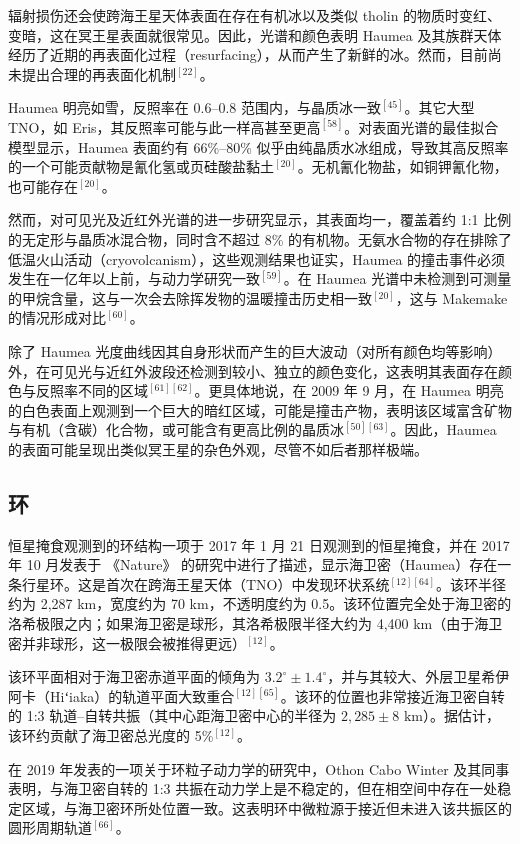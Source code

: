 辐射损伤还会使跨海王星天体表面在存在有机冰以及类似 tholin 的物质时变红、变暗，这在冥王星表面就很常见。因此，光谱和颜色表明 Haumea 及其族群天体经历了近期的再表面化过程（resurfacing），从而产生了新鲜的冰。然而，目前尚未提出合理的再表面化机制$^{[22]}$。

Haumea 明亮如雪，反照率在 0.6–0.8 范围内，与晶质冰一致$^{[45]}$。其它大型 TNO，如 Eris，其反照率可能与此一样高甚至更高$^{[58]}$。对表面光谱的最佳拟合模型显示，Haumea 表面约有 66\%–80\% 似乎由纯晶质水冰组成，导致其高反照率的一个可能贡献物是氰化氢或页硅酸盐黏土$^{[20]}$。无机氰化物盐，如铜钾氰化物，也可能存在$^{[20]}$。

然而，对可见光及近红外光谱的进一步研究显示，其表面均一，覆盖着约 1:1 比例的无定形与晶质冰混合物，同时含不超过 8\% 的有机物。无氨水合物的存在排除了低温火山活动（cryovolcanism），这些观测结果也证实，Haumea 的撞击事件必须发生在一亿年以上前，与动力学研究一致$^{[59]}$。在 Haumea 光谱中未检测到可测量的甲烷含量，这与一次会去除挥发物的温暖撞击历史相一致$^{[20]}$，这与 Makemake 的情况形成对比$^{[60]}$。

除了 Haumea 光度曲线因其自身形状而产生的巨大波动（对所有颜色均等影响）外，在可见光与近红外波段还检测到较小、独立的颜色变化，这表明其表面存在颜色与反照率不同的区域$^{[61][62]}$。更具体地说，在 2009 年 9 月，在 Haumea 明亮的白色表面上观测到一个巨大的暗红区域，可能是撞击产物，表明该区域富含矿物与有机（含碳）化合物，或可能含有更高比例的晶质冰$^{[50][63]}$。因此，Haumea 的表面可能呈现出类似冥王星的杂色外观，尽管不如后者那样极端。
\subsection{环}
恒星掩食观测到的环结构一项于 2017 年 1 月 21 日观测到的恒星掩食，并在 2017 年 10 月发表于 《Nature》 的研究中进行了描述，显示海卫密（Haumea）存在一条行星环。这是首次在跨海王星天体（TNO）中发现环状系统$^{[12][64]}$。该环半径约为 2,287 km，宽度约为 70 km，不透明度约为 0.5。该环位置完全处于海卫密的洛希极限之内；如果海卫密是球形，其洛希极限半径大约为 4,400 km（由于海卫密并非球形，这一极限会被推得更远）$^{[12]}$。

该环平面相对于海卫密赤道平面的倾角为 $3.2^\circ \pm 1.4^\circ$，并与其较大、外层卫星希伊阿卡（Hiʻiaka）的轨道平面大致重合$^{[12][65]}$。该环的位置也非常接近海卫密自转的 1:3 轨道–自转共振（其中心距海卫密中心的半径为 $2,285 \pm 8 \text{ km}$）。据估计，该环约贡献了海卫密总光度的 5\%$^{[12]}$。

在 2019 年发表的一项关于环粒子动力学的研究中，Othon Cabo Winter 及其同事表明，与海卫密自转的 1:3 共振在动力学上是不稳定的，但在相空间中存在一处稳定区域，与海卫密环所处位置一致。这表明环中微粒源于接近但未进入该共振区的圆形周期轨道$^{[66]}$。
